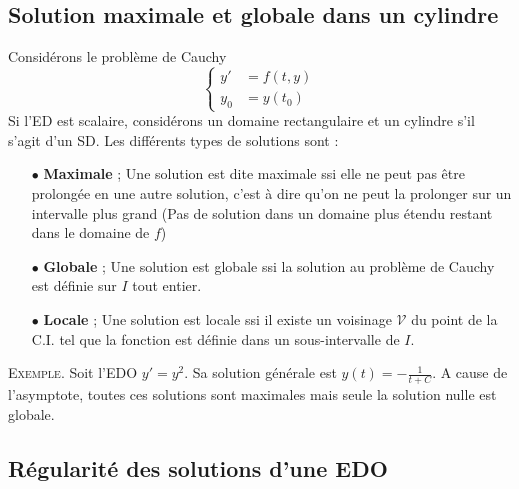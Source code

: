 \subsection{Solution maximale et globale dans un cylindre}
Considérons le problème de Cauchy
\begin{equation}
	\left\{\begin{array}{ll}
	y' &= f(t,y)\\
	y_0 &= y(t_0)
	\end{array}\right.
\end{equation}
Si l'ED est scalaire, considérons un domaine rectangulaire et un cylindre s'il 
s'agit d'un SD. Les différents types de solutions sont :
\begin{enumerate}
	\item[$\bullet$] \textbf{Maximale} ; Une solution est dite maximale ssi elle ne 
	      peut pas être prolongée en une autre solution, c'est à dire qu'on ne peut la 
	      prolonger sur un intervalle plus grand (Pas de solution dans un domaine plus 
	      étendu restant dans le domaine de $f$)
	\item[$\bullet$] \textbf{Globale} ; Une solution est globale ssi la solution 
	      au problème de Cauchy est définie sur $I$ tout entier. 
	\item[$\bullet$] \textbf{Locale} ; Une solution est locale ssi il existe un 
	      voisinage $\mathcal{V}$ du point de la C.I. tel que la fonction est définie 
	      dans un sous-intervalle de $I$.
\end{enumerate}

\textsc{Exemple}. Soit l'EDO $y'=y^2$. Sa solution générale est $y(t) = 
-\frac{1}{t+C}$. A cause de l'asymptote, toutes ces solutions sont maximales 
mais seule la solution nulle est globale.
	
\newpage
\subsection{Régularité des solutions d'une EDO}
\ \\
	
